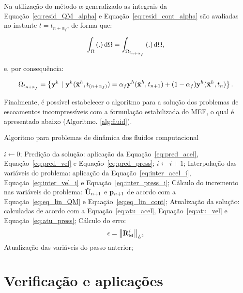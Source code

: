 Na utilização do método $\alpha$-generalizado as integrais da Equação~\eqref{eq:resid_QM_alpha} e Equação~\eqref{eq:resid_cont_alpha} são avaliadas no instante $t = t_{n+\alpha_{f}}$, de forma que:

\begin{align}
\int_{\Omega} \left(.\right) \mathrm{d} \Omega = \int_{\Omega_{t_{n+\alpha_{f}}}} \left(.\right) \mathrm{d} \Omega,
\end{align}

\noindent e, por consequência:

\begin{align}
\Omega_{t_{n+\alpha_{f}}} = \left\{\mathbf{y}^h \  |\  \mathbf{y}^h(\bar{\mathbf{x}}^h,t_{(n+\alpha_f)}) = \alpha_f \mathbf{y}^h(\bar{\mathbf{x}}^h,t_{n+1}) + (1-\alpha_f) \mathbf{y}^h(\bar{\mathbf{x}}^h,t_n)  \right\}.
\end{align}

Finalmente, é possível estabelecer o algoritmo para a solução dos problemas de escoamentos incompressíveis com a formulação estabilizada do MEF, o qual é apresentado abaixo (Algoritmo. \ref{alg:fluid}).

\begin{algorithm}
	\caption{Algoritmo para problemas de dinâmica dos fluidos computacional}
	\label{alg:fluid}
	\begin{algorithmic}[1]
		\State $i \gets 0$;
		\State Predição da solução: aplicação da Equação~\eqref{eq:pred_acel}, Equação~\eqref{eq:pred_vel} e Equação~\eqref{eq:pred_press};
		\State $i \gets i+1$;
		\State Interpolação das variáveis do problema: aplicação da Equação~\eqref{eq:inter_acel_i}, Equação~\eqref{eq:inter_vel_i} e Equação~\eqref{eq:inter_press_i};
		\State Cálculo do incremento nas variáveis do problema: $\mathbf{\dot{U}}_{n+1}$ e $\mathbf{p}_{n+1}$ de acordo com a Equação~\eqref{eq:eq_lin_QM} e Equação~\eqref{eq:eq_lin_cont};
		\State Atualização da solução: calculadas de acordo com a Equação~\eqref{eq:atu_acel}, Equação~\eqref{eq:atu_vel} e Equação~\eqref{eq:atu_press};
		\State Cálculo do erro:
		\begin{align}
		\epsilon =\left\| \mathbf{R}_\mathrm{M}^i \right\|_{L^2}
		\end{align}
		\EndWhile
		\State Atualização das variáveis do passo anterior;
		\EndFor
	\end{algorithmic}
\end{algorithm}

\section{Verificação e aplicações} \label{capitulo:Cap2:VerApl}

